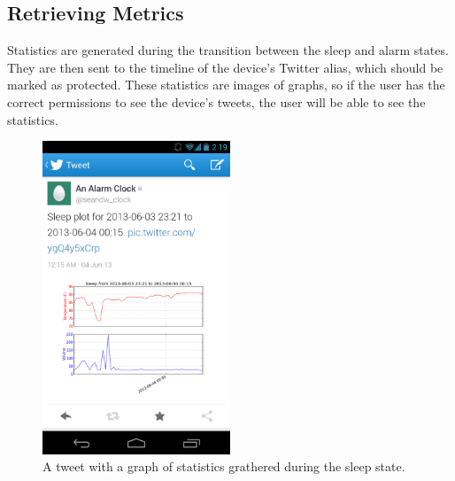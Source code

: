 \subsection{Retrieving Metrics}
Statistics are generated during the transition between the sleep and
alarm states. They are then sent to the timeline of the device's
Twitter alias, which should be marked as protected. These statistics
are images of graphs, so if the user has the correct permissions to
see the device's tweets, the user will be able to see the statistics.

\begin{figure}[h!]
  \centering
  \includegraphics[width=0.5\textwidth]{twitmetrics}
  \caption{A tweet with a graph of statistics grathered during the
    sleep state.}
\end{figure}
